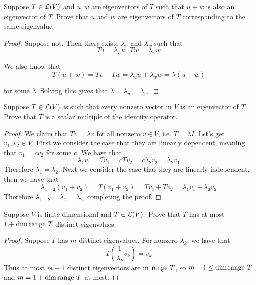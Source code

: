 \documentclass{extarticle}
\begin{document}
\begin{problem}{25}
    Suppose \(T \in \mathcal{L}(V)\) and \(u, w\) are eigenvectors of \(T\) such that 
    \(u + w\) is also an eigenvector of \(T\). Prove that \(u\) and \(w\) are eigenvectors 
    of \(T\) corresponding to the same eigenvalue.  
\end{problem}

\begin{proof}
Suppose not. Then there exists \(\lambda_u\) and \(\lambda_w\) such that 
\[Tu = \lambda_u u \ \ \ Tw = \lambda_w w\]

We also know that 
\[T(u+w) = Tu + Tw = \lambda_u u + \lambda_w w = \lambda(u + w)\]

for some \(\lambda\). Solving this gives that \(\lambda = \lambda_u = \lambda_w\).
\end{proof}

\begin{problem}{26}
    Suppose \(T \in \mathcal{L}(V)\) is such that every nonzero vector in \(V\) is an eigenvector of 
    \(T\). Prove that \(T\) is a scalar multiple of the identity operator. 
\end{problem}

\begin{proof}
We claim that \(Tv = \lambda v\) for all nonzero \(v \in V\), i.e. \(T = \lambda I\). Let's 
get \(v_1, v_2 \in V\). First we consider the case that they are linearly dependent, meaning 
that \(v_1 = c v_2\) for some \(c\). We have that 
\[\lambda_1 v_1 = Tv_1 = c Tv_2 = c \lambda_2 v_2 = \lambda_2 v_1\]
Therefore \(\lambda_1 = \lambda_2\). Next we consider the case that they are linearly independent, 
then we have that 
\[ \lambda_{1+2} (v_1 + v_2) = T (v_1 + v_2) = Tv_1 + Tv_2 = \lambda_1 v_1 + \lambda_2 v_2 \]
Therefore \(\lambda_{1+2} = \lambda_1  = \lambda_2\), completing the proof. 
\end{proof}

\begin{problem}{28}
    Suppose \(V\) is finite-dimensional and \(T \in \mathcal{L}(V)\). Prove that \(T\) has at most 
    \(1 + \dim \text{range } T\) distinct eigenvalues. 
\end{problem}

\begin{proof}
Suppose \(T\) has \(m\) distinct eigenvalues. For nonzero \(\lambda_k\), we have that 
\[T \left(\frac{1}{\lambda_k} v_k \right) = v_k\]
Thus at most \(m-1\) distinct eigenvectors are in \(\text{range } T\), so \(m - 1 \leq \dim \text{range } T\)
and \(m = 1 + \dim \text{range } T\) at most. 
\end{proof}
\end{document}
